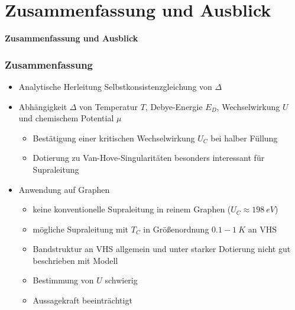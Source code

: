 \section{Zusammenfassung und Ausblick}

\begin{frame}[plain]
    \centering
    \Large
    \textbf{Zusammenfassung und Ausblick}
\end{frame}

\begin{frame}
    \frametitle{Zusammenfassung}
    \begin{itemize}
        \item Analytische Herleitung Selbstkonsistenzgleichung von $\Delta$
        \item Abhängigkeit $\Delta$ von Temperatur $T$, Debye-Energie $E_D$, Wechselwirkung $U$ und chemischem Potential $\mu$ 
        \begin{itemize}
            \item[$\rightarrow$] Bestätigung einer kritischen Wechselwirkung $U_C$ bei halber Füllung
            \item[$\rightarrow$] Dotierung zu Van-Hove-Singularitäten besonders interessant für Supraleitung
        \end{itemize}
        \item Anwendung auf Graphen
        \begin{itemize}
            \item[$\rightarrow$] keine konventionelle Supraleitung in reinem Graphen ($U_C \approx \qty{198}{eV}$)
            \item[$\rightarrow$] mögliche Supraleitung mit $T_C$ in Größenordnung $\num{0,1} - \qty{1}{K}$ an VHS
            \item[$\rightarrow$] Bandstruktur an VHS allgemein und unter starker Dotierung nicht gut beschrieben mit Modell
            \item[$\rightarrow$] Bestimmung von $U$ schwierig 
            \item[$\implies$] Aussagekraft beeinträchtigt
        \end{itemize}
    \end{itemize}
\end{frame}

